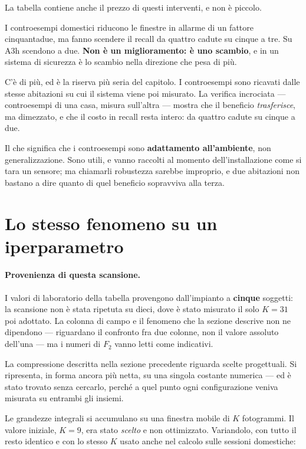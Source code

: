 La tabella contiene anche il prezzo di questi interventi, e non è piccolo.

I controesempi domestici riducono le finestre in allarme di un fattore
cinquantadue, ma fanno scendere il recall da quattro cadute su cinque a tre. Su
A3h scendono a due. \textbf{Non è un miglioramento: è uno scambio}, e in un
sistema di sicurezza è lo scambio nella direzione che pesa di più.

C'è di più, ed è la riserva più seria del capitolo. I controesempi sono
ricavati dalle stesse abitazioni su cui il sistema viene poi misurato. La
verifica incrociata --- controesempi di una casa, misura sull'altra --- mostra
che il beneficio \emph{trasferisce}, ma dimezzato, e che il costo in recall
resta intero: da quattro cadute su cinque a due.

Il che significa che i controesempi sono \textbf{adattamento all'ambiente}, non
generalizzazione. Sono utili, e vanno raccolti al momento dell'installazione
come si tara un sensore; ma chiamarli robustezza sarebbe improprio, e due
abitazioni non bastano a dire quanto di quel beneficio sopravviva alla terza.

\section{Lo stesso fenomeno su un iperparametro}
\label{sec:finestra-k}

\paragraph{Provenienza di questa scansione.} I valori di laboratorio della
tabella provengono dall'impianto a \textbf{cinque} soggetti: la scansione non
è stata ripetuta su dieci, dove è stato misurato il solo $K = 31$ poi adottato.
La colonna di campo e il fenomeno che la sezione descrive non ne dipendono ---
riguardano il confronto fra due colonne, non il valore assoluto dell'una ---
ma i numeri di $F_2$ vanno letti come indicativi.


La compressione descritta nella sezione precedente riguarda scelte progettuali. Si ripresenta, in forma ancora più netta, su una singola costante numerica --- ed è stato trovato senza cercarlo, perché a quel punto ogni configurazione veniva misurata su entrambi gli insiemi.

Le grandezze integrali si accumulano su una finestra mobile di $K$ fotogrammi. Il valore iniziale, $K = 9$, era stato \emph{scelto} e non ottimizzato. Variandolo, con tutto il resto identico e con lo stesso $K$ usato anche nel calcolo sulle sessioni domestiche:


